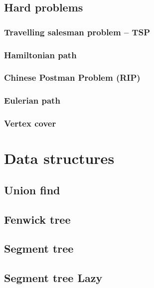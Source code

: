 \documentclass[a4paper]{article}
\begin{document}
    \subsection{Hard problems}
        \subsubsection{Travelling salesman problem -- TSP}
            
        \subsubsection{Hamiltonian path}
            
        \subsubsection{Chinese Postman Problem (RIP)}
            
        \subsubsection{Eulerian path}
            
        \subsubsection{Vertex cover}
            

\section{Data structures}
    \subsection{Union find}
        
    \subsection{Fenwick tree}
        
    \subsection{Segment tree}
        
    \subsection{Segment tree Lazy}
        
\end{document}

